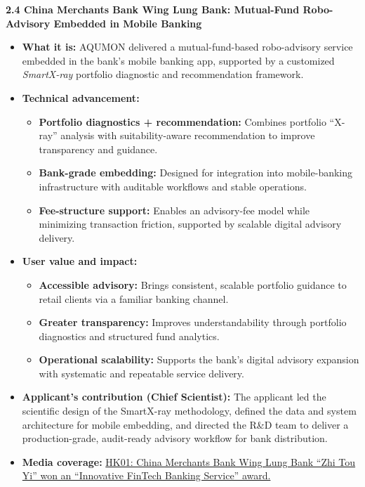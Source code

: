 \documentclass[11pt]{article}
\newcommand{\CVSubsection}[1]{\textbf{#1}\par}
\newenvironment{tightitemize}{%
  \begin{itemize}[leftmargin=*,nosep,topsep=2pt]
}{\end{itemize}}
\begin{document}
\CVSubsection{2.4 China Merchants Bank Wing Lung Bank: Mutual-Fund Robo-Advisory Embedded in Mobile Banking}

\begin{tightitemize}
  \item \textbf{What it is:} AQUMON delivered a mutual-fund-based robo-advisory service embedded in the bank’s mobile banking app, supported by a customized \textit{SmartX-ray} portfolio diagnostic and recommendation framework.
  \item \textbf{Technical advancement:}
  \begin{tightitemize}
    \item \textbf{Portfolio diagnostics + recommendation:} Combines portfolio ``X-ray'' analysis with suitability-aware recommendation to improve transparency and guidance.
    \item \textbf{Bank-grade embedding:} Designed for integration into mobile-banking infrastructure with auditable workflows and stable operations.
    \item \textbf{Fee-structure support:} Enables an advisory-fee model while minimizing transaction friction, supported by scalable digital advisory delivery.
  \end{tightitemize}
  \item \textbf{User value and impact:}
  \begin{tightitemize}
    \item \textbf{Accessible advisory:} Brings consistent, scalable portfolio guidance to retail clients via a familiar banking channel.
    \item \textbf{Greater transparency:} Improves understandability through portfolio diagnostics and structured fund analytics.
    \item \textbf{Operational scalability:} Supports the bank’s digital advisory expansion with systematic and repeatable service delivery.
  \end{tightitemize}
  \item \textbf{Applicant’s contribution (Chief Scientist):} The applicant led the scientific design of the SmartX-ray methodology, defined the data and system architecture for mobile embedding, and directed the R\&D team to deliver a production-grade, audit-ready advisory workflow for bank distribution.
  \item \textbf{Media coverage:}
  \href{https://www.hk01.com/%E8%B2%A1%E7%B6%93%E5%BF%AB%E8%A8%8A/710212/%E6%8B%9B%E5%95%86%E6%B0%B8%E9%9A%86%E9%8A%80%E8%A1%8C-%E6%99%BA%E6%8A%95%E6%98%93-%E6%9C%8D%E5%8B%99%E7%8D%B2-%E5%89%B5%E6%96%B0%E9%87%91%E8%9E%8D%E7%A7%91%E6%8A%80%E9%8A%80%E8%A1%8C%E6%9C%8D%E5%8B%99-%E7%8D%8E}{HK01: China Merchants Bank Wing Lung Bank ``Zhi Tou Yi'' won an ``Innovative FinTech Banking Service'' award.}
\end{tightitemize}
\end{document}
